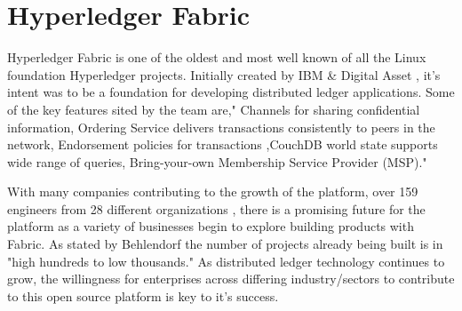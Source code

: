 \section{Hyperledger Fabric}

Hyperledger Fabric is one of the oldest and most well known of all the 
Linux foundation Hyperledger projects. Initially created by IBM & Digital 
Asset , it’s intent was to be a foundation for developing distributed ledger 
applications. Some of the key features sited by the team are," Channels for 
sharing confidential information, Ordering Service delivers transactions 
consistently to peers in the network, Endorsement policies for transactions
,CouchDB world state supports wide range of queries, Bring-your-own Membership 
Service Provider (MSP)."\cite{Hyperledger Fabric}

With many companies contributing to the growth of the platform, over 159 engineers
from 28 different organizations \cite{Behlendorf Interview}, there is a promising
future for the platform as a variety of businesses begin to explore building products
with Fabric. As stated by Behlendorf the number of projects already being built is in
"high hundreds to low thousands." \cite{Behlendorf Interview} As distributed ledger
technology continues to grow, the willingness for enterprises across differing
industry/sectors to contribute to this open source platform is key to it's 
success.

